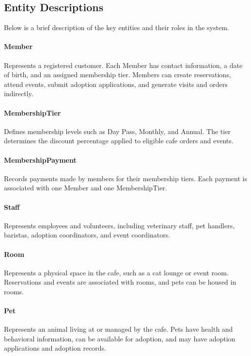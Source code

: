 \documentclass[11pt]{article}
\begin{document}
\subsection{Entity Descriptions}

Below is a brief description of the key entities and their roles in the system.

\paragraph{Member}
Represents a registered customer. Each Member has contact information, a date of birth,
and an assigned membership tier. Members can create reservations, attend events,
submit adoption applications, and generate visits and orders indirectly.

\paragraph{MembershipTier}
Defines membership levels such as Day Pass, Monthly, and Annual.
The tier determines the discount percentage applied to eligible cafe orders and events.

\paragraph{MembershipPayment}
Records payments made by members for their membership tiers. Each payment is associated
with one Member and one MembershipTier.

\paragraph{Staff}
Represents employees and volunteers, including veterinary staff, pet handlers,
baristas, adoption coordinators, and event coordinators.

\paragraph{Room}
Represents a physical space in the cafe, such as a cat lounge or event room.
Reservations and events are associated with rooms, and pets can be housed in rooms.

\paragraph{Pet}
Represents an animal living at or managed by the cafe. Pets have health and behavioral
information, can be available for adoption, and may have adoption applications and
adoption records.
\end{document}
